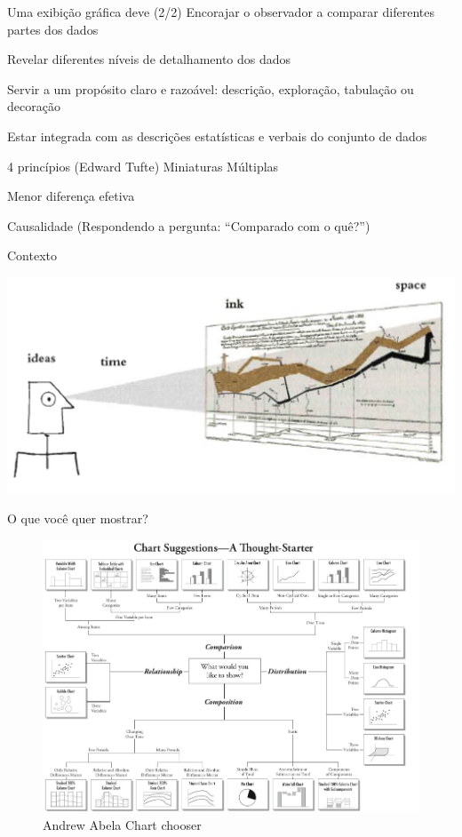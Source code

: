 \documentclass[
  9pt,
  ignorenonframetext,
]{beamer}
\begin{document}
\begin{frame}{Uma exibição gráfica deve (2/2)}
\protect\hypertarget{uma-exibiuxe7uxe3o-gruxe1fica-deve-22}{}
Encorajar o observador a comparar diferentes partes dos dados

Revelar diferentes níveis de detalhamento dos dados

Servir a um propósito claro e razoável: descrição, exploração, tabulação
ou decoração

Estar integrada com as descrições estatísticas e verbais do conjunto de
dados
\end{frame}

\begin{frame}{4 princípios (Edward Tufte)}
\protect\hypertarget{princuxedpios-edward-tufte}{}
Miniaturas Múltiplas

Menor diferença efetiva

Causalidade (Respondendo a pergunta: ``Comparado com o quê?'')

Contexto
\end{frame}

\begin{frame}{}
\protect\hypertarget{section}{}
\includegraphics{imgs/ideas_ink_space_time.png}
\end{frame}

\begin{frame}{O que você quer mostrar?}
\protect\hypertarget{o-que-vocuxea-quer-mostrar}{}
\begin{figure}
\centering
\includegraphics{imgs/Pic_2.png}
\caption{Andrew Abela Chart chooser}
\end{figure}
\end{frame}
\end{document}
